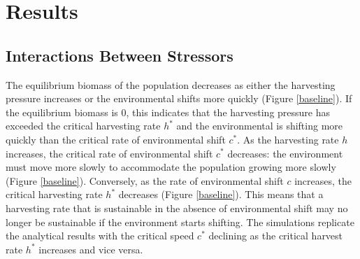 \documentclass[]{article}
\begin{document}
\section{Results}

\subsection{Interactions Between Stressors }

The equilibrium biomass of the population decreases as either the harvesting pressure 
increases or the environmental shifts more quickly (Figure \ref{baseline}). If the equilibrium biomass is $0$, this 
indicates that the harvesting pressure has exceeded the critical harvesting rate $h^*$ and the environmental 
is shifting more quickly than the critical rate of environmental shift $c^*$. As the harvesting rate $h$ increases, 
the critical rate of environmental shift $c^*$ decreases: the environment must move more slowly to 
accommodate the population growing more slowly (Figure \ref{baseline}). Conversely, as the rate of 
environmental shift $c$ increases, the critical harvesting rate $h^*$ decreases (Figure  \ref{baseline}). This 
means that a harvesting rate that is sustainable in the absence of environmental shift may no longer be sustainable if 
the environment starts shifting. The simulations replicate the analytical results with the critical speed $c^*$ 
declining as the critical harvest rate $h^*$ increases and vice versa.
\end{document}
